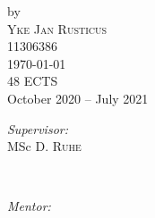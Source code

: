 \begin{titlepage}
by\\[0.2cm]

\textsc{\Large Yke Jan Rusticus}\\[0.2cm] %

11306386\\[1cm]










{\Large \today}\\[1cm] %



48 ECTS\\ %

October 2020 -- July 2021\\[1cm]%






\begin{minipage}[t]{0.4\textwidth}

\begin{flushleft} \large

\emph{Supervisor:} \\

MSc D. \textsc{Ruhe} %

\end{flushleft}

\end{minipage}

~

\begin{minipage}[t]{0.4\textwidth}

\begin{flushleft} \large

\vspace{-3pt}\emph{Mentor:} \\


\end{flushleft}
\end{minipage}
\end{titlepage}
